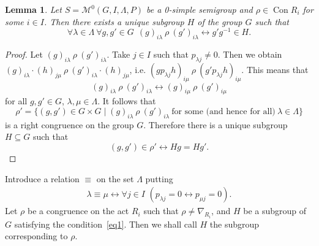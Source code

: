 \documentclass{birkau}
\numberwithin{equation}{section}
\theoremstyle{plain}
\newtheorem{lemma}[theorem]{Lemma}
\theoremstyle{definition}
\DeclareMathOperator{\Con}{Con}
\begin{document}
	\begin{lemma} \label{lemma:B}
	    Let $S=\mathcal{M}^0(G,I,\Lambda,P)$ be a 0-simple semigroup and $\rho \in \Con R_i$ for some $i \in I$. Then there exists a unique subgroup $H$ of the group $G$ such that
	    \begin{equation} \label{eq1}
	        \forall \lambda \in \Lambda \ \forall g,g' \in G \ \ (g)_{i\lambda} \ \rho \ (g')_{i \lambda} \leftrightarrow g'g^{-1} \in H.
	    \end{equation}
	\end{lemma}
	\begin{proof}
	    Let $(g)_{i \lambda} \ \rho \ (g')_{i \lambda}$. Take $j \in I$ such that $p_{\lambda j} \neq 0$. Then we obtain $(g)_{i \lambda} \cdot (h)_{j \mu} \ \rho \ (g')_{i \lambda} \cdot (h)_{j \mu}$, i.e. $(gp_{\lambda j}h)_{i \mu} \ \rho \ (g' p_{\lambda j} h)_{i \mu}$. This means that $$ (g)_{i \lambda} \ \rho \ (g')_{i \lambda} \leftrightarrow(g)_{i \mu} \ \rho \ (g')_{i \mu} $$ for all $g, g' \in G$, $\lambda, \mu \in \Lambda$. It follows that $$ \rho' = \{ (g,g') \in G \times G \mid (g)_{i \lambda} \ \rho \ (g')_{i \lambda} \ \text{for some (and hence for all)} \ \lambda \in \Lambda \} $$ is a right congruence on the group $G$. Therefore there is a unique subgroup $H \subseteq G$ such that $$ (g,g') \in \rho' \leftrightarrow Hg = Hg'. $$
	\end{proof}
	
	Introduce a relation $\equiv$ on the set $\Lambda$ putting
	\begin{gather}
	    \lambda \equiv \mu \leftrightarrow \forall j\in I \,\,(p_{\lambda j} =0 \leftrightarrow p_{\mu j}=0). \label{eq821}
	\end{gather}
	Let $\rho$ be a congruence on the act $R_i$ such that $\rho \ne \nabla_{R_i}$, and $H$ be a subgroup of $G$ satisfying the condition~\eqref{eq1}. Then we shall call $H$ the subgroup corresponding to $\rho$.
\end{document}
